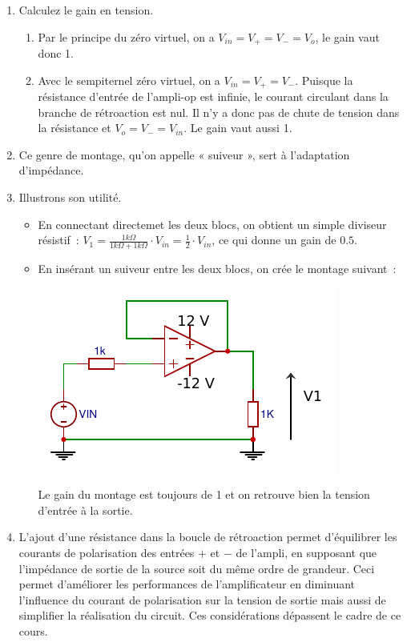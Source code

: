 \documentclass{../template/tp}
\begin{document}
{
	\begin{enumerate}
		\item Calculez le gain en tension.
		\begin{enumerate}[label=\alph*)]
			\item Par le principe du zéro virtuel, on a $V_{in} = V_+ = V_- = V_o$, le gain vaut donc 1.
			\item Avec le sempiternel zéro virtuel, on a $V_{in} = V_+ = V_-$. Puisque la résistance d'entrée de l'ampli-op est infinie, le courant circulant dans la branche de rétroaction est nul. Il n'y a donc pas de chute de tension dans la résistance et $V_o = V_- = V_{in}$. Le gain vaut aussi 1.
		\end{enumerate}

		\item Ce genre de montage, qu'on appelle « suiveur », sert à l'adaptation d'impédance.

		\item Illustrons son utilité.
		\begin{itemize}
			\item En connectant directemet les deux blocs, on obtient un simple diviseur résistif~: $V_1 = \frac{1k\Omega}{1k\Omega+1k\Omega} \cdot V_{in} = \frac{1}{2}\cdot V_{in}$, ce qui donne un gain de $0.5$.

			\item En insérant un suiveur entre les deux blocs, on crée le montage suivant~:
			\begin{center}
				\includegraphics[scale=1.4]{suiveur-adaptation-impedance.pdf}
			\end{center}

			Le gain du montage est toujours de 1 et on retrouve bien la tension d'entrée à la sortie.
		\end{itemize}
		\item %
		L'ajout d'une résistance dans la boucle de rétroaction permet d'équilibrer les courants de polarisation des entrées $+$ et $-$ de l'ampli, en supposant que l'impédance de sortie de la source soit du même ordre de grandeur. Ceci permet d'améliorer les performances de l'amplificateur en diminuant l'influence du courant de polarisation sur la tension de sortie mais aussi de simplifier la réalisation du circuit. Ces considérations dépassent le cadre de ce cours.
	\end{enumerate}
}
\end{document}
